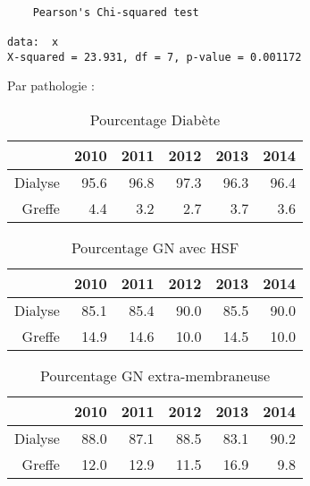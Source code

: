 \documentclass[11pt,a4paper]{article}\usepackage[]{graphicx}\usepackage[]{color}
\makeatletter
\newenvironment{kframe}{%
 \def\at@end@of@kframe{}%
 \ifinner\ifhmode%
  \def\at@end@of@kframe{\end{minipage}}%
  \begin{minipage}{\columnwidth}%
 \fi\fi%
 \def\FrameCommand##1{\hskip\@totalleftmargin \hskip-\fboxsep
 \colorbox{shadecolor}{##1}\hskip-\fboxsep
     \hskip-\linewidth \hskip-\@totalleftmargin \hskip\columnwidth}%
 \MakeFramed {\advance\hsize-\width
   \@totalleftmargin\z@ \linewidth\hsize
   \@setminipage}}%
 {\par\unskip\endMakeFramed%
 \at@end@of@kframe}
\newenvironment{knitrout}{}{} %
\makeatother
\begin{document}
\begin{knitrout}
\color{fgcolor}\begin{kframe}
\begin{verbatim}

	Pearson's Chi-squared test

data:  x
X-squared = 23.931, df = 7, p-value = 0.001172
\end{verbatim}
\end{kframe}
\end{knitrout}


Par pathologie :

\begin{multicols}{2}
\begin{table}[H]
\centering
\begin{tabular}{rrrrrr}
  \hline
 & 2010 & 2011 & 2012 & 2013 & 2014 \\ 
  \hline
Dialyse & 95.6 & 96.8 & 97.3 & 96.3 & 96.4 \\ 
  Greffe & 4.4 & 3.2 & 2.7 & 3.7 & 3.6 \\ 
   \hline
\end{tabular}
\caption{Pourcentage Diabète} 
\end{table}
\begin{table}[H]
\centering
\begin{tabular}{rrrrrr}
  \hline
 & 2010 & 2011 & 2012 & 2013 & 2014 \\ 
  \hline
Dialyse & 85.1 & 85.4 & 90.0 & 85.5 & 90.0 \\ 
  Greffe & 14.9 & 14.6 & 10.0 & 14.5 & 10.0 \\ 
   \hline
\end{tabular}
\caption{Pourcentage GN avec HSF} 
\end{table}
\begin{table}[H]
\centering
\begin{tabular}{rrrrrr}
  \hline
 & 2010 & 2011 & 2012 & 2013 & 2014 \\ 
  \hline
Dialyse & 88.0 & 87.1 & 88.5 & 83.1 & 90.2 \\ 
  Greffe & 12.0 & 12.9 & 11.5 & 16.9 & 9.8 \\ 
   \hline
\end{tabular}
\caption{Pourcentage GN extra-membraneuse} 
\end{table}

\end{multicols}
\end{document}
